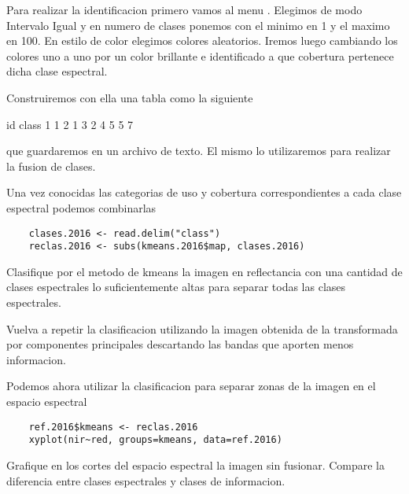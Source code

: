\documentclass[a4paper]{article}
\begin{document}
Para realizar la identificacion primero vamos al menu . Elegimos de modo
Intervalo Igual y en numero de clases ponemos con el minimo en 1 y el maximo en
100. En estilo de color elegimos colores aleatorios. Iremos luego cambiando los
colores uno a uno por un color brillante e identificado a que cobertura
pertenece dicha clase espectral.

Construiremos con ella una tabla como la siguiente

\begin{verbatin}
    id  class
    1   1
    2   1
    3   2
    4   5
    5   7
\end{verbatin}

que guardaremos en un archivo de texto. El mismo lo utilizaremos para realizar
la fusion de clases.

Una vez conocidas las categorias de uso y cobertura correspondientes a cada
clase espectral podemos combinarlas

\begin{lstlisting}
    clases.2016 <- read.delim("class")
    reclas.2016 <- subs(kmeans.2016$map, clases.2016)
\end{lstlisting}

\begin{act}
    Clasifique por el metodo de kmeans la imagen en reflectancia con una
    cantidad de clases espectrales lo suficientemente altas para separar todas
    las clases espectrales.
\end{act}

\begin{act}
    Vuelva a repetir la clasificacion utilizando la imagen obtenida de la
    transformada por componentes principales descartando las bandas que aporten
    menos informacion.
\end{act}

Podemos ahora utilizar la clasificacion para separar zonas de la imagen en el
espacio espectral

\begin{lstlisting}
    ref.2016$kmeans <- reclas.2016
    xyplot(nir~red, groups=kmeans, data=ref.2016)
\end{lstlisting}

\begin{act}
    Grafique en los cortes del espacio espectral la imagen sin fusionar. Compare
    la diferencia entre clases espectrales y clases de informacion.
\end{act}
\end{document}

